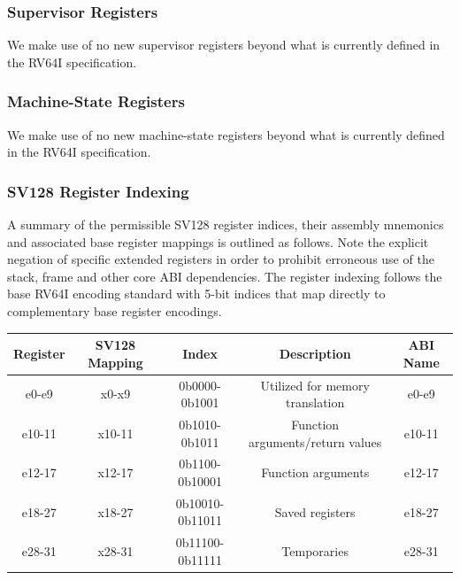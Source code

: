\documentclass{article}
\begin{document}
\begin{center}
\end{center}

\subsubsection{Supervisor Registers}

We make use of no new supervisor registers beyond what is 
currently defined in the RV64I specification.  

\subsubsection{Machine-State Registers}

We make use of no new machine-state registers beyond what is 
currently defined in the RV64I specification.  

\newpage
\subsubsection{SV128 Register Indexing}
A summary of the permissible SV128 register indices, their assembly 
mnemonics and associated base register mappings is outlined as follows.  
Note the explicit negation of specific extended registers in order to prohibit 
erroneous use of the stack, frame and other core ABI dependencies.  The register 
indexing follows the base RV64I encoding standard with 5-bit indices that 
map directly to complementary base register encodings.  

\begin{center}
\begin{tabular}{| c | c | c | c | c |}
\hline
Register & SV128 Mapping & Index & Description & ABI Name\\ \hline
\hline
e0-e9 & x0-x9 & 0b0000-0b1001 & Utilized for memory translation & e0-e9\\
\hline
e10-11 & x10-11 & 0b1010-0b1011 & Function arguments/return values & e10-11\\
\hline
e12-17 & x12-17 & 0b1100-0b10001 & Function arguments & e12-17\\
\hline
e18-27 & x18-27 & 0b10010-0b11011 & Saved registers & e18-27\\
\hline
e28-31 & x28-31 & 0b11100-0b11111 & Temporaries & e28-31\\
\hline
\end{tabular}
\end{center}
\end{document}
